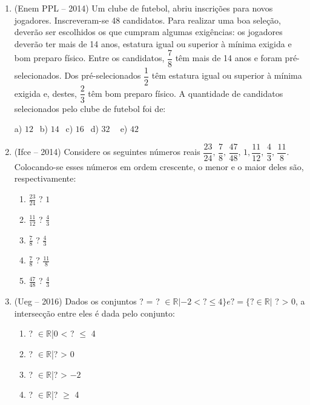 \begin{multicols*}{2}
\begin{enumerate}
\begin{enumerate}
		\end{enumerate}

	\item (Enem PPL – 2014) Um clube de futebol, abriu inscrições para novos jogadores. Inscreveram-se 48 candidatos. Para realizar uma boa seleção, deverão ser escolhidos os que cumpram algumas exigências: os jogadores deverão ter mais de 14 anos, estatura igual ou superior à mínima exigida e bom preparo físico. Entre os candidatos, $\dfrac{7}{8}$ têm mais de 14 anos e foram pré-selecionados. Dos pré-selecionados $\dfrac{1}{2}$ têm estatura igual ou superior à mínima exigida e, destes, $\dfrac{2}{3}$ têm bom preparo físico. A quantidade de candidatos selecionados pelo clube de futebol foi de: 
		
		a) $12 \ \ $ b) $14 \ \ $ c) $16 \ \ $ d) $32 \ \ \ \ $ e) $42 \ \ $
		
	\item (Ifce – 2014) Considere os seguintes números reais $\dfrac{23}{24},\, \dfrac{7}{8},\, \dfrac{47}{48},\, 1, \dfrac{11}{12},\, \dfrac{4}{3},\, \dfrac{11}{8} $. Colocando-se esses números em ordem crescente, o menor e o maior deles são, respectivamente: 
		
		\begin{enumerate}				
		
		\item $ \frac{23}{24}$ ? $ 1 $ 
		\item $ \frac{11}{12}$ ? $ \frac{4}{3} $ 
		\item $ \frac{7}{8}$ ? $ \frac{4}{3} $ 
		\item $ \frac{7}{8}$ ? $ \frac{11}{8} $ 
		\item $ \frac{47}{48}$ ? $ \frac{4}{3} $

		\end{enumerate}
		
	\item (Ueg – 2016) Dados os conjuntos ? = {? $\in \mathbb{R}|-2 <  ?  \leq 4\} e ? = \{? \in \mathbb{R}|$ ? > 0}, a intersecção entre eles é dada pelo conjunto: 
		
		\begin{enumerate}				
		
		\item {? $\in \mathbb{R}$|0 < ? $\leq$ 4} 
		\item {? $\in \mathbb{R}$|? > 0} 
		\item {? $\in \mathbb{R}$|? > $ -2 $} 
		\item {? $\in \mathbb{R}$|? $\geq$ 4} 


\end{enumerate}
\end{enumerate}
\end{multicols*}
